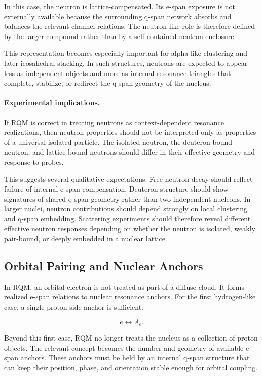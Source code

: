 \documentclass[11pt,a4paper]{article}
\begin{document}
In this case, the neutron is lattice-compensated. Its e-span exposure is not externally available because the surrounding q-span network absorbs and balances the relevant channel relations. The neutron-like role is therefore defined by the larger compound rather than by a self-contained neutron enclosure.

This representation becomes especially important for alpha-like clustering and later icosahedral stacking. In such structures, neutrons are expected to appear less as independent objects and more as internal resonance triangles that complete, stabilize, or redirect the q-span geometry of the nucleus.



\paragraph{Experimental implications.}

If RQM is correct in treating neutrons as context-dependent resonance realizations, then neutron properties should not be interpreted only as properties of a universal isolated particle. The isolated neutron, the deuteron-bound neutron, and lattice-bound neutrons should differ in their effective geometry and response to probes.

This suggests several qualitative expectations. Free neutron decay should reflect failure of internal e-span compensation. Deuteron structure should show signatures of shared q-span geometry rather than two independent nucleons. In larger nuclei, neutron contributions should depend strongly on local clustering and q-span embedding. Scattering experiments should therefore reveal different effective neutron responses depending on whether the neutron is isolated, weakly pair-bound, or deeply embedded in a nuclear lattice.


\subsection{Orbital Pairing and Nuclear Anchors}

In RQM, an orbital electron is not treated as part of a diffuse cloud. It forms realized e-span relations to nuclear resonance anchors. For the first hydrogen-like case, a single proton-side anchor is sufficient:

\[
e \leftrightarrow A_e .
\]

Beyond this first case, RQM no longer treats the nucleus as a collection of proton objects. The relevant concept becomes the number and geometry of available e-span anchors. These anchors must be held by an internal q-span structure that can keep their position, phase, and orientation stable enough for orbital coupling.
\end{document}
